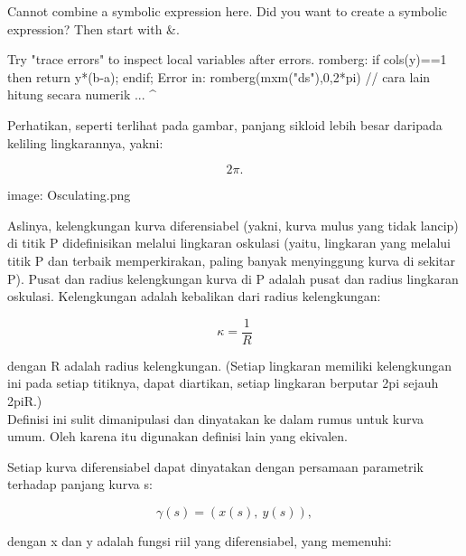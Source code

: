 \documentclass[a4paper,10pt]{article}
\begin{document}
\begin{eulernotebook}
\begin{euleroutput}
  Cannot combine a symbolic expression here.
  Did you want to create a symbolic expression?
  Then start with &.
  
  Try "trace errors" to inspect local variables after errors.
  romberg:
      if cols(y)==1 then return y*(b-a); endif;
  Error in:
  romberg(mxm("ds"),0,2*pi) // cara lain hitung secara numerik ...
                           ^
\end{euleroutput}
\begin{eulercomment}
Perhatikan, seperti terlihat pada gambar, panjang sikloid lebih besar daripada keliling lingkarannya, yakni:

\end{eulercomment}
\begin{eulerformula}
\[
2\pi.
\]
\end{eulerformula}
\begin{eulercomment}
image: Osculating.png

Aslinya, kelengkungan kurva diferensiabel (yakni, kurva mulus yang tidak lancip) di titik P didefinisikan melalui lingkaran
oskulasi (yaitu, lingkaran yang melalui titik P dan terbaik memperkirakan, paling banyak menyinggung kurva di sekitar P). Pusat
dan radius kelengkungan kurva di P adalah pusat dan radius lingkaran oskulasi. Kelengkungan adalah kebalikan dari radius
kelengkungan:

\end{eulercomment}
\begin{eulerformula}
\[
\kappa =\frac {1}{R}
\]
\end{eulerformula}
\begin{eulercomment}
dengan R adalah radius kelengkungan. (Setiap lingkaran memiliki kelengkungan ini pada setiap titiknya, dapat diartikan, setiap
lingkaran berputar 2pi sejauh 2piR.)\\
Definisi ini sulit dimanipulasi dan dinyatakan ke dalam rumus untuk kurva umum. Oleh karena itu digunakan definisi lain yang
ekivalen.

\end{eulercomment}
\begin{eulercomment}
Setiap kurva diferensiabel dapat dinyatakan dengan persamaan parametrik terhadap panjang kurva s:

\end{eulercomment}
\begin{eulerformula}
\[
\gamma(s) = (x(s),\ y(s)),
\]
\end{eulerformula}
\begin{eulercomment}
dengan x dan y adalah fungsi riil yang diferensiabel, yang memenuhi:


\end{eulercomment}
\end{eulernotebook}
\end{document}
